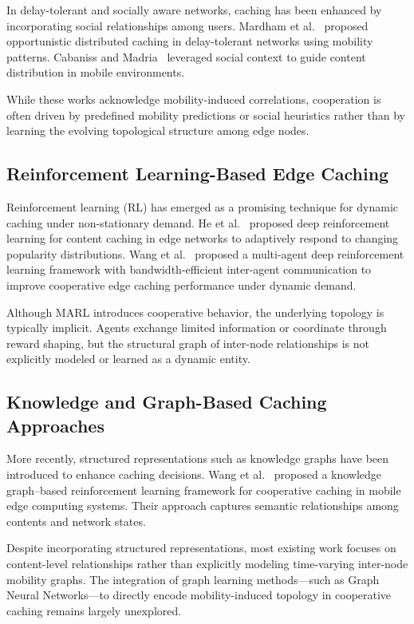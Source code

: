 In delay-tolerant and socially aware networks, caching has been enhanced by incorporating social relationships among users. Mardham et al.~\cite{Mardham2018} proposed opportunistic distributed caching in delay-tolerant networks using mobility patterns. Cabaniss and Madria~\cite{Cabaniss2014} leveraged social context to guide content distribution in mobile environments.

While these works acknowledge mobility-induced correlations, cooperation is often driven by predefined mobility predictions or social heuristics rather than by learning the evolving topological structure among edge nodes.

\subsection{Reinforcement Learning-Based Edge Caching}

Reinforcement learning (RL) has emerged as a promising technique for dynamic caching under non-stationary demand. He et al.~\cite{He2018RL} proposed deep reinforcement learning for content caching in edge networks to adaptively respond to changing popularity distributions. Wang et al.~\cite{Min2020MARL} proposed a multi-agent deep reinforcement learning framework with bandwidth-efficient inter-agent communication to improve cooperative edge caching performance under dynamic demand.

Although MARL introduces cooperative behavior, the underlying topology is typically implicit. Agents exchange limited information or coordinate through reward shaping, but the structural graph of inter-node relationships is not explicitly modeled or learned as a dynamic entity.

\subsection{Knowledge and Graph-Based Caching Approaches}

More recently, structured representations such as knowledge graphs have been introduced to enhance caching decisions. Wang et al.~\cite{Wang2024KGCoopCaching} proposed a knowledge graph–based reinforcement learning framework for cooperative caching in mobile edge computing systems. Their approach captures semantic relationships among contents and network states.

Despite incorporating structured representations, most existing work focuses on content-level relationships rather than explicitly modeling time-varying inter-node mobility graphs. The integration of graph learning methods—such as Graph Neural Networks—to directly encode mobility-induced topology in cooperative caching remains largely unexplored.

